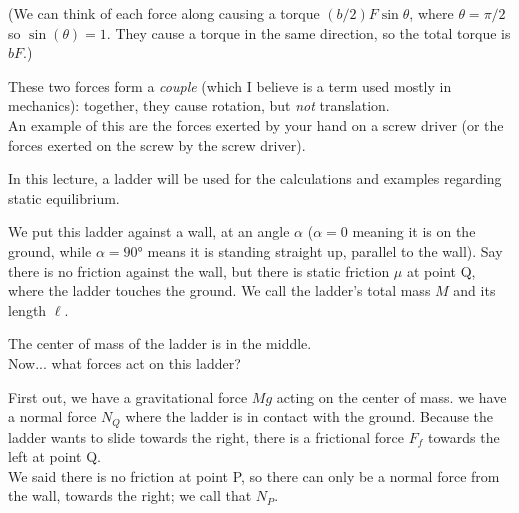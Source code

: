 (We can think of each force along causing a torque $(b/2) F \sin \theta$, where $\theta = \pi/2$ so $\sin(\theta) = 1$. They cause a torque in the same direction, so the total torque is $b F$.)

These two forces form a \emph{couple} (which I believe is a term used mostly in mechanics): together, they cause rotation, but \emph{not} translation.\\
An example of this are the forces exerted by your hand on a screw driver (or the forces exerted on the screw by the screw driver).

In this lecture, a ladder will be used for the calculations and examples regarding static equilibrium.

We put this ladder against a wall, at an angle $\alpha$ ($\alpha = 0$ meaning it is on the ground, while $\alpha = \ang{90}$ means it is standing straight up, parallel to the wall). Say there is no friction against the wall, but there is static friction $\mu$ at point Q, where the ladder touches the ground. We call the ladder's total mass $M$ and its length $\ell$.

\begin{figure}[H]
  \centering
{}
\end{figure}

The center of mass of the ladder is in the middle.\\
Now... what forces act on this ladder?

First out, we have a gravitational force $M g$ acting on the center of mass.
 we have a normal force $N_Q$ where the ladder is in contact with the ground. Because the ladder wants to slide towards the right, there is a frictional force $F_f$ towards the left at point Q.\\
We said there is no friction at point P, so there can only be a normal force from the wall, towards the right; we call that $N_P$.


